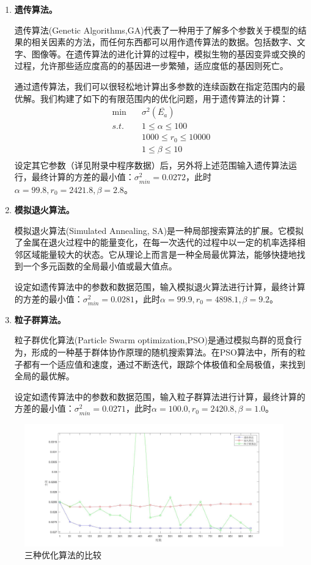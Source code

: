 \documentclass{cumcm}
\begin{document}
\begin{enumerate}[(1)]
	\item \textbf{遗传算法。}\par
	遗传算法(Genetic Algorithms,\;GA)代表了一种用于了解多个参数关于模型的结果的相关因素的方法，而任何东西都可以用作遗传算法的数据。包括数字、文字、图像等。在遗传算法的进化计算的过程中，模拟生物的基因变异或交换的过程，允许那些适应度高的的基因进一步繁殖，适应度低的基因则死亡\cite{ga_al}。\par
	通过遗传算法，我们可以很轻松地计算出多参数的连续函数在指定范围内的最优解。我们构建了如下的有限范围内的优化问题，用于遗传算法的计算：
	\begin{equation}
		\begin{aligned}
			\min\quad & \sigma^2(\overline{E_a}) \\
			s.t.\quad & 1\le \alpha \le 100 \\
			& 1000\le r_0 \le 10000 \\
			& 1\le \beta \le 10 \\
		\end{aligned}
	\end{equation}
	设定其它参数（详见附录中程序数据）后，另外将上述范围输入遗传算法运行，最终计算的方差的最小值：$\sigma_{min}^2=0.0272$，此时$\alpha=99.8,r_0=2421.8,\beta=2.8$。
	\item \textbf{模拟退火算法。}\par
	模拟退火算法(Simulated Annealing, SA)是一种局部搜索算法的扩展。它模拟了金属在退火过程中的能量变化，在每一次迭代的过程中以一定的机率选择相邻区域能量较大的状态\cite{sa_al}。它从理论上而言是一种全局最优算法，能够快捷地找到一个多元函数的全局最小值或最大值点。\par
	设定如遗传算法中的参数和数据范围，输入模拟退火算法进行计算，最终计算的方差的最小值：$\sigma_{min}^2=0.0281$，此时$\alpha=99.9,r_0=4898.1,\beta=9.2$。
	\item \textbf{粒子群算法。}\par
	粒子群优化算法(Particle Swarm optimization,\;PSO)是通过模拟鸟群的觅食行为，形成的一种基于群体协作原理的随机搜索算法。在PSO算法中，所有的粒子都有一个适应值和速度，通过不断迭代，跟踪个体极值和全局极值，来找到全局的最优解\cite{pso_al}。\par
	设定如遗传算法中的参数和数据范围，输入粒子群算法进行计算，最终计算的方差的最小值：$\sigma_{min}^2=0.0271$，此时$\alpha=100.0,r_0=2420.8,\beta=1.0$。
\end{enumerate}
\begin{figure}[H]
	\centering
	\includegraphics[width=1.0\textwidth]{img/problem4_al.jpg}
	\caption{三种优化算法的比较}
	\label{fi:problem4al}
\end{figure}
\end{document}
